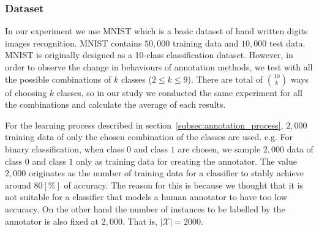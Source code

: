 \documentclass[a4paper,conference]{IEEEtran}
\begin{document}
\subsubsection{Dataset}\label{subsec:dataset}
In our experiment we use MNIST which is a basic dataset of hand written digits images recognition.
MNIST contains $50,000$ training data and $10,000$ test data.
MNIST is originally designed as a 10-class classification dataset.
However, in order to observe the change in behaviours of annotation methods, we test with all the possible combinations of $k$ classes ($2 \le k \le 9$).
There are total of $\binom{10}{k}$ ways of choosing $k$ classes, so in our study we conducted the same experiment for all the combinations and calculate the average of each results.

For the learning process described in section~\ref{subsec:annotation_process}, $2,000$ training data of only the chosen combination of the classes are used.
e.g. For binary classification, when class $0$ and class $1$ are chosen, we sample $2,000$ data of class $0$ and class $1$ only as training data for creating the annotator.
The value $2,000$ originates as the number of training data for a classifier to stably achieve around $80 [\%]$ of accuracy.
The reason for this is because we thought that it is not suitable for a classifier that models a human annotator to have too low accuracy.
On the other hand the number of instances to be labelled by the annotator is also fixed at $2,000$.
That is, $|\mathcal{X}|=2000$.
\end{document}
